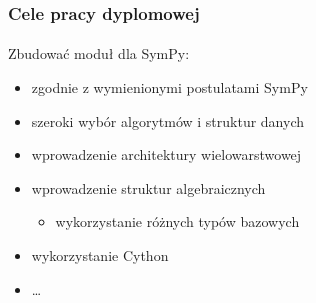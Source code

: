 \documentclass{beamer}
\begin{document}
\begin{frame}
    \frametitle{Cele pracy dyplomowej}
    \framesubtitle{}

    Zbudować moduł  dla SymPy:
    \begin{itemize}
        \item zgodnie z wymienionymi postulatami SymPy
        \pause
        \item szeroki wybór algorytmów i struktur danych
        \pause
        \item wprowadzenie architektury wielowarstwowej
        \pause
        \item wprowadzenie struktur algebraicznych
            \begin{itemize}
                \item wykorzystanie różnych typów bazowych
            \end{itemize}
        \pause
        \item wykorzystanie  Cython
        \pause
        \item \ldots
    \end{itemize}
\end{frame}
\end{document}
